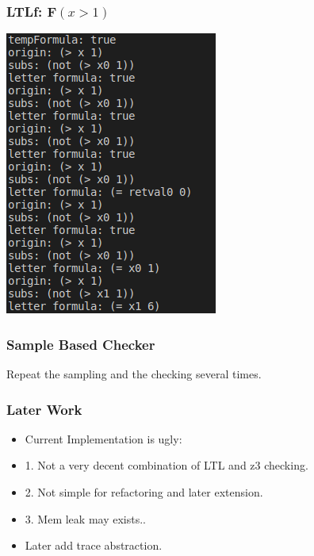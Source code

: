 \documentclass[11pt]{beamer}
\begin{document}
\begin{frame}\frametitle{LTLf: $\mathbf{F}(x > 1)$}

\begin{center}
\includegraphics[scale=0.6]{fx>1.png}
\end{center}

\end{frame}

\begin{frame}\frametitle{Sample Based Checker}

Repeat the sampling and the checking several times.

\end{frame}

\begin{frame}\frametitle{Later Work}
\begin{itemize}
\item Current Implementation is ugly:
\item 1. Not a very decent combination of LTL and z3 checking.
\item 2. Not simple for refactoring and later extension.
\item 3. Mem leak may exists..
\item Later add trace abstraction.
\end{itemize}

\end{frame}
\end{document}
